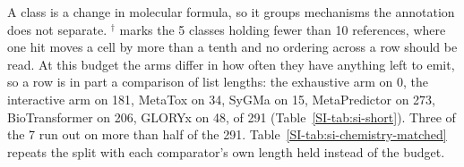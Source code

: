 \begin{table}[t]
\begin{threeparttable}
\begin{tablenotes}[flushleft]
\item A class is a change in molecular formula, so it groups mechanisms the annotation does not separate. $^{\dagger}$ marks the 5 classes holding fewer than 10 references, where one hit moves a cell by more than a tenth and no ordering across a row should be read. At this budget the arms differ in how often they have anything left to emit, so a row is in part a comparison of list lengths: the exhaustive arm on 0, the interactive arm on 181, MetaTox on 34, SyGMa on 15, MetaPredictor on 273, BioTransformer on 206, GLORYx on 48, of 291 (Table~\ref{SI-tab:si-short}). Three of the 7 run out on more than half of the 291. Table~\ref{SI-tab:si-chemistry-matched} repeats the split with each comparator's own length held instead of the budget.
\end{tablenotes}
\end{threeparttable}
\end{table}

